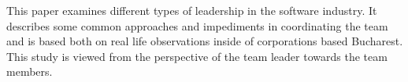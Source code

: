 
This paper examines different types of leadership in the software industry. It describes some common approaches and impediments in coordinating the team and is based both on real life observations inside of corporations based Bucharest. This study is viewed from the perspective of the team leader towards the team members.
